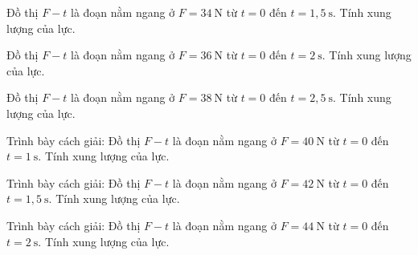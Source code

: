 \begin{ex}
Đồ thị $F-t$ là đoạn nằm ngang ở $F=34\ \mathrm{N}$ từ $t=0$ đến $t=1,5\ \mathrm{s}$. Tính xung lượng của lực.
\end{ex}

\begin{ex}
Đồ thị $F-t$ là đoạn nằm ngang ở $F=36\ \mathrm{N}$ từ $t=0$ đến $t=2\ \mathrm{s}$. Tính xung lượng của lực.
\end{ex}

\begin{ex}
Đồ thị $F-t$ là đoạn nằm ngang ở $F=38\ \mathrm{N}$ từ $t=0$ đến $t=2,5\ \mathrm{s}$. Tính xung lượng của lực.
\end{ex}

\begin{bt}
Trình bày cách giải: Đồ thị $F-t$ là đoạn nằm ngang ở $F=40\ \mathrm{N}$ từ $t=0$ đến $t=1\ \mathrm{s}$. Tính xung lượng của lực.
\end{bt}

\begin{bt}
Trình bày cách giải: Đồ thị $F-t$ là đoạn nằm ngang ở $F=42\ \mathrm{N}$ từ $t=0$ đến $t=1,5\ \mathrm{s}$. Tính xung lượng của lực.
\end{bt}

\begin{bt}
Trình bày cách giải: Đồ thị $F-t$ là đoạn nằm ngang ở $F=44\ \mathrm{N}$ từ $t=0$ đến $t=2\ \mathrm{s}$. Tính xung lượng của lực.
\end{bt}

